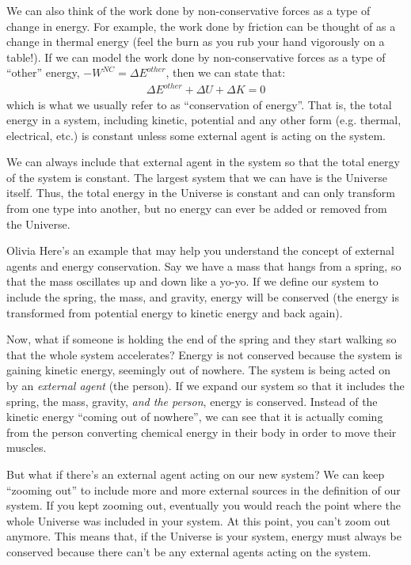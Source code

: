 We can also think of the work done by non-conservative forces as a type of change in energy. For example, the work done by friction can be thought of as a change in thermal energy (feel the burn as you rub your hand vigorously on a table!). If we can model the work done by non-conservative forces as a type of ``other'' energy, $-W^{NC}=\Delta E^{other}$, then we can state that:
\begin{align*}
\Delta E^{other} + \Delta U + \Delta K =0
\end{align*}
which is what we usually refer to as ``conservation of energy''. That is, the total energy in a system, including kinetic, potential and any other form (e.g. thermal, electrical, etc.) is constant unless some external agent is acting on the system. 

We can always include that external agent in the system so that the total energy of the system is constant. The largest system that we can have is the Universe itself. Thus, the total energy in the Universe is constant and can only transform from one type into another, but no energy can ever be added or removed from the Universe.
\vspace{-0.25cm}
\begin{studentOpinion}{Olivia}
Here's an example that may help you understand the concept of external agents and energy conservation. Say we have a mass that hangs from a spring, so that the mass oscillates up and down like a yo-yo. If we define our system to include the spring, the mass, and gravity, energy will be conserved (the energy is transformed from potential energy to kinetic energy and back again). 

Now, what if someone is holding the end of the spring and they start walking so that the whole system accelerates? Energy is not conserved because the system is gaining kinetic energy, seemingly out of nowhere. The system is being acted on by an \textit{external agent} (the person). If we expand our system so that it includes the spring, the mass, gravity, \textit{and the person}, energy is conserved. Instead of the kinetic energy ``coming out of nowhere'', we can see that it is actually coming from the person converting chemical energy in their body in order to move their muscles.

But what if there's an external agent acting on our new system? We can keep ``zooming out'' to include more and more external sources in the definition of our system. If you kept zooming out, eventually you would reach the point where the whole Universe was included in your system. At this point, you can't zoom out anymore. This means that, if the Universe is your system, energy must always be conserved because there can't be any external agents acting on the system. 
\end{studentOpinion}
